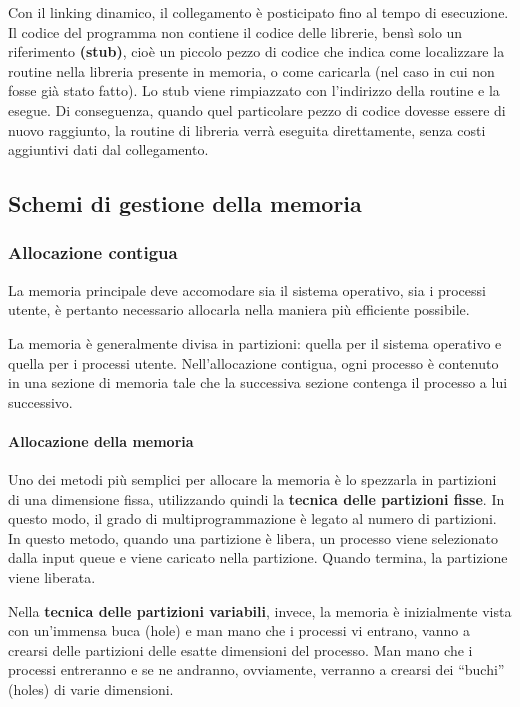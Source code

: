 \documentclass[a4paper]{article}
\begin{document}
Con il linking dinamico, il collegamento è posticipato fino al tempo di esecuzione. Il codice del programma non contiene il codice delle librerie, bensì solo un riferimento \textbf{(stub)}, cioè un piccolo pezzo di codice che indica come localizzare la routine nella libreria presente in memoria, o come caricarla (nel caso in cui non fosse già stato fatto). Lo stub viene rimpiazzato con l'indirizzo della routine e la esegue. Di conseguenza, quando quel particolare pezzo di codice dovesse essere di nuovo raggiunto, la routine di libreria verrà eseguita direttamente, senza costi aggiuntivi dati dal collegamento.

\subsection{Schemi di gestione della memoria}

\subsubsection{Allocazione contigua}
La memoria principale deve accomodare sia il sistema operativo, sia i processi utente, è pertanto necessario allocarla nella maniera più efficiente possibile.

La memoria è generalmente divisa in partizioni: quella per il sistema operativo e quella per i processi utente. Nell'allocazione contigua, ogni processo è contenuto in una sezione di memoria tale che la successiva sezione contenga il processo a lui successivo.

\paragraph{Allocazione della memoria}
Uno dei metodi più semplici per allocare la memoria è lo spezzarla in partizioni di una dimensione fissa, utilizzando quindi la \textbf{tecnica delle partizioni fisse}. In questo modo, il grado di multiprogrammazione è legato al numero di partizioni. In questo metodo, quando una partizione è libera, un processo viene selezionato dalla input queue e viene caricato nella partizione. Quando termina, la partizione viene liberata.

Nella \textbf{tecnica delle partizioni variabili}, invece, la memoria è inizialmente vista con un'immensa buca (hole) e man mano che i processi vi entrano, vanno a crearsi delle partizioni delle esatte dimensioni del processo. Man mano che i processi entreranno e se ne andranno, ovviamente, verranno a crearsi dei ``buchi'' (holes) di varie dimensioni.
\end{document}

